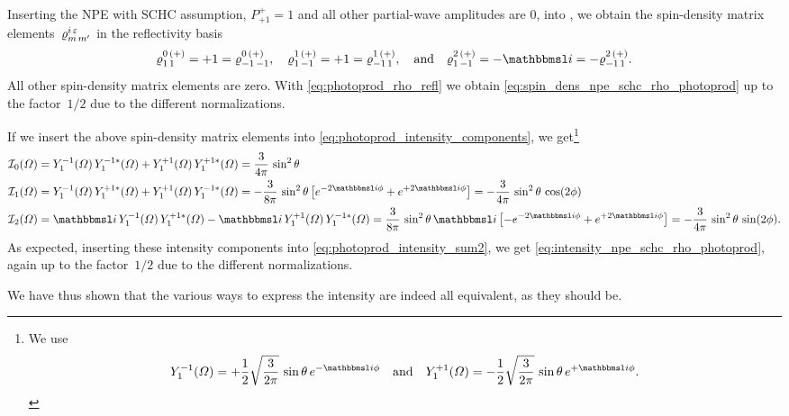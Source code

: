 Inserting the NPE with SCHC assumption, \ie $P^+_{+1} = 1$ and all
other partial-wave amplitudes are 0, into
, we
obtain the spin-density matrix elements~$\varrho^{i\, \varepsilon}_{m\, m'}$
in the reflectivity basis
\begin{equation}
  \varrho^{0\, (+)}_{1\, 1}
  = +1
  = \varrho^{0\, (+)}_{{-1}\, {-1}},
  \quad
  \varrho^{1\, (+)}_{1\, {-1}}
  = +1
  = \varrho^{1\, (+)}_{{-1}\, 1},
  \quad\text{and}\quad
  \varrho^{2\, (+)}_{1\, {-1}}
  = -\imag
  = -\varrho^{2\, (+)}_{{-1}\, 1}.
\end{equation}
All other spin-density matrix elements are zero.  With
\cref{eq:photoprod_rho_refl} we obtain
\cref{eq:spin_dens_npe_schc_rho_photoprod} up to the factor~$1 / 2$
due to the different normalizations.

If we insert the above spin-density matrix elements into
\cref{eq:photoprod_intensity_components}, we get\footnote{%
  We use
  \begin{equation}
    Y_1^{-1}(\Omega)
    = +\frac{1}{2} \sqrt{\frac{3}{2 \pi}}\, \sin \theta\, e^{-\imag \phi}
    \quad\text{and}\quad
    Y_1^{+1}(\Omega)
    = -\frac{1}{2} \sqrt{\frac{3}{2 \pi}}\, \sin \theta\, e^{+\imag \phi}.
  \end{equation}
}
\begin{align*}
  \intensity_0(\Omega)
  ={}& Y_1^{-1}(\Omega)\, Y_1^{-1 *}(\Omega) + Y_1^{+1}(\Omega)\, Y_1^{+1 *}(\Omega)
  = \frac{3}{4 \pi}\, \sin^2 \theta
  \\
  \intensity_1(\Omega)
  ={}& Y_1^{-1}(\Omega)\, Y_1^{+1 *}(\Omega) + Y_1^{+1}(\Omega)\, Y_1^{-1 *}(\Omega)
  = -\frac{3}{8 \pi}\, \sin^2 \theta \sBrk[1]{e^{-2 \imag \phi} + e^{+2 \imag \phi}}
  = -\frac{3}{4 \pi}\, \sin^2 \theta\, \cos(2 \phi)
  \\
  \intensity_2(\Omega)
  ={}& \imag\, Y_1^{-1}(\Omega)\, Y_1^{+1 *}(\Omega) - \imag\, Y_1^{+1}(\Omega)\, Y_1^{-1 *}(\Omega)
  = \frac{3}{8 \pi}\, \sin^2 \theta\, \imag \sBrk[1]{-e^{-2 \imag \phi} + e^{+2 \imag \phi}}
  = -\frac{3}{4 \pi}\, \sin^2 \theta\, \sin(2 \phi).
\end{align*}
As expected, inserting these intensity components into
\cref{eq:photoprod_intensity_sum2}, we get
\cref{eq:intensity_npe_schc_rho_photoprod}, again up to the factor~$1
/ 2$ due to the different normalizations.

We have thus shown that the various ways to express the intensity are
indeed all equivalent, as they should be.
